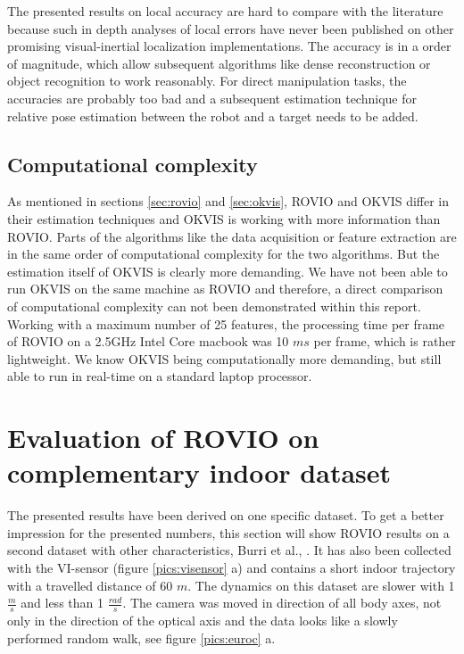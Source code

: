 The presented results on local accuracy are hard to compare with the literature because such in depth analyses of local errors have never been published on other promising visual-inertial localization implementations. The accuracy is in a order of magnitude, which allow subsequent algorithms like dense reconstruction or object recognition to work reasonably. For direct manipulation tasks, the accuracies are probably too bad and a subsequent estimation technique for relative pose estimation between the robot and a target needs to be added.


\subsection{Computational complexity}
\label{sec:ijrr_complexity}

As mentioned in sections \ref{sec:rovio} and \ref{sec:okvis}, ROVIO and OKVIS differ in their estimation techniques and OKVIS is working with more information than ROVIO. Parts of the algorithms like the data acquisition or feature extraction are in the same order of computational complexity for the two algorithms. But the estimation itself of OKVIS is clearly more demanding. We have not been able to run OKVIS on the same machine as ROVIO and therefore, a direct comparison of computational complexity can not been demonstrated within this report. Working with a maximum number of 25 features, the processing time per frame of ROVIO on a 2.5GHz Intel Core macbook was 10 $ms$ per frame, which is rather lightweight. We know OKVIS being computationally more demanding, but still able to run in real-time on a standard laptop processor.


\section{Evaluation of ROVIO on complementary indoor dataset}
\label{sec:euroc}

The presented results have been derived on one specific dataset. To get a better impression for the presented numbers, this section will show ROVIO results on a second dataset with other characteristics, Burri et al., \cite{burri2015euroc}. It has also been collected with the VI-sensor (figure \ref{pics:visensor} a) and contains a short indoor trajectory with a travelled distance of 60 $m$. The dynamics on this dataset are slower with 1 $\frac{m}{s}$ and less than 1 $\frac{rad}{s}$. The camera was moved in direction of all body axes, not only in the direction of the optical axis and the data looks like a slowly performed random walk, see figure \ref{pics:euroc} a. \\

